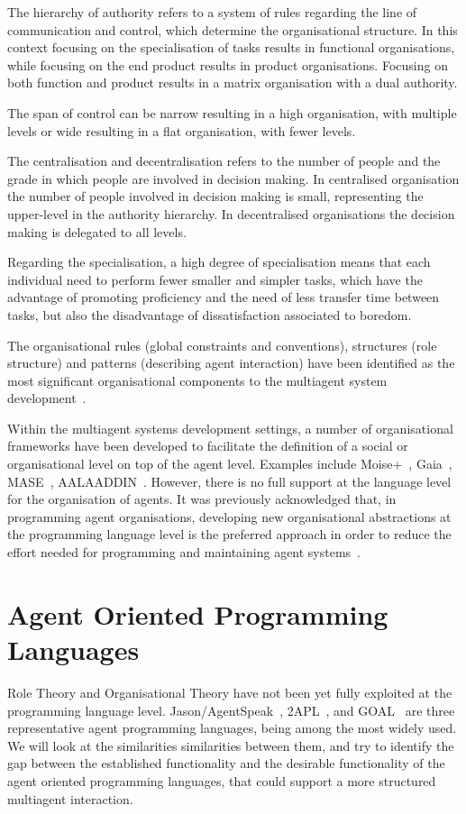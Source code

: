 \documentclass[a4paper,12pt,oneside,fleqn]{book} %
\begin{document}
The hierarchy of authority refers to a system of rules regarding the line
of communication and control, which determine the organisational structure.
In this context focusing on the specialisation of tasks results in
functional organisations, while focusing on the end product results in
product organisations. Focusing on both function and product results in a
matrix organisation with a dual authority.

The span of control can be narrow resulting in a high organisation, with
multiple levels or wide resulting in a flat organisation, with fewer levels.

The centralisation and decentralisation refers to the number of people and
the grade in which people are involved in decision making. In centralised
organisation the number of people involved in decision making is small,
representing the upper-level in the authority hierarchy. In decentralised
organisations the decision making is delegated to all levels.

Regarding the specialisation, a high degree of specialisation means that
each individual need to perform fewer smaller and simpler tasks, which have
the advantage of promoting proficiency and the need of less transfer time
between tasks, but also the disadvantage of dissatisfaction associated to
boredom.

The organisational rules (global constraints and conventions), structures
(role structure) and patterns (describing agent interaction) have been
identified as the most significant organisational components to the
multiagent system development~\cite{DBLP:conf/aose/ZambonelliJW00}.

Within the multiagent systems development settings, a number of
organisational frameworks have been developed to facilitate the definition
of a social or organisational level on top of the agent level. Examples
include Moise+~\cite{DBLP:conf/atal/HubnerSB02},
Gaia~\cite{DBLP:journals/aamas/WooldridgeJK00},
MASE~\cite{deloach2001analysis}, AALAADDIN~\cite{ferber1998meta}.  However,
there is no full support at the language level for the organisation of
agents. It was previously acknowledged that, in programming agent
organisations, developing new organisational abstractions at the
programming language level is the preferred approach in order to reduce the
effort needed for programming and maintaining agent
systems~\cite{DBLP:conf/esaw/RiemsdijkHJ09}.
\section{Agent Oriented Programming Languages} %
Role Theory and Organisational Theory have not been yet fully exploited at
the programming language level.
Jason/AgentSpeak~\cite{DBLP:books/sp/map2005/BordiniHV05},
2APL~\cite{DBLP:journals/aamas/Dastani08}, and
GOAL~\cite{DBLP:journals/corr/cs-AI-0207008} are three representative agent
programming languages, being among the most widely used. We will look at
the similarities similarities between them, and try to identify the gap
between the established functionality and the desirable functionality of
the agent oriented programming languages, that could support a more
structured multiagent interaction.
\end{document}
